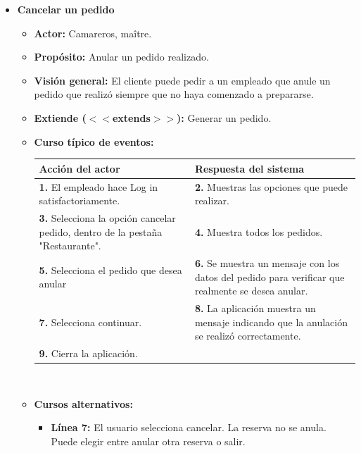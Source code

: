 \documentclass[spanish,a4paper,12pt]{report}		%
\begin{document}
\begin{itemize}

		\item \textbf{Cancelar un pedido}
			\begin{itemize}
			\item \textbf{Actor:} Camareros, maître.
			\item \textbf{Propósito: } Anular un pedido realizado.
			\item \textbf{Visión general:} El cliente puede pedir a un empleado que anule un pedido que realizó siempre que no haya comenzado a prepararse.
			\item \textbf{Extiende ($<<$extends$>>$):} Generar un pedido.
			\item \textbf{Curso típico de eventos:} 	\\
				\begin{tabular}{|p{6cm}||p{6cm}|}
				\hline
				\textbf{Acción del actor} & \textbf{Respuesta del sistema} \\ \hline \hline
				\textbf{1.} El empleado hace Log in satisfactoriamente. & \textbf{2.} Muestras las opciones que puede realizar. \\ \hline
				\textbf{3.} Selecciona la opción cancelar pedido, dentro de la pestaña "Restaurante". & \textbf{4.} Muestra todos los pedidos. \\ \hline
				\textbf{5.} Selecciona el pedido que desea anular	& \textbf{6.} Se muestra un mensaje con los datos del pedido para verificar que realmente se desea anular. \\ \hline
				\textbf{7.} Selecciona continuar.	& \textbf{8.} La aplicación muestra un mensaje indicando que la anulación se realizó correctamente. \\ \hline
				\textbf{9.} Cierra la aplicación. &  \\ \hline
			\end{tabular}
			\\
			\item \textbf{Cursos alternativos:} 
			\begin{itemize}
			\item  \textbf{Línea 7:} El usuario selecciona cancelar. La reserva no se anula. Puede elegir entre anular otra reserva o salir.
			\end {itemize}
		\end {itemize}
		


\end{itemize}
\end{document}
